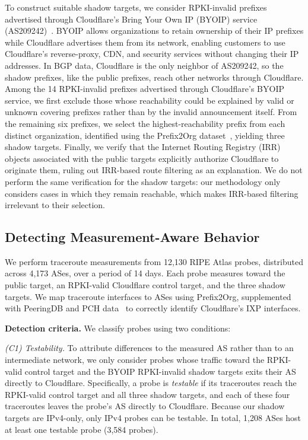 \documentclass[sigconf, 10pt]{acmart}
\begin{document}
To construct suitable shadow targets, we consider RPKI-invalid prefixes advertised through Cloudflare's Bring Your Own IP (BYOIP) service (AS209242)~\cite{byoip}. BYOIP allows organizations to retain ownership of their IP prefixes while Cloudflare advertises them from its network, enabling customers to use Cloudflare's reverse-proxy, CDN, and security services without changing their IP addresses. In BGP data, Cloudflare is the only neighbor of AS209242, so the shadow prefixes, like the public prefixes, reach other networks through Cloudflare. Among the 14 RPKI-invalid prefixes advertised through Cloudflare's BYOIP service, we first exclude those whose reachability could be explained by valid or unknown covering prefixes rather than by the invalid announcement itself. From the remaining six prefixes, we select the highest-reachability prefix from each distinct organization, identified using the Prefix2Org dataset~\cite{prefix2org}, yielding three shadow targets. Finally, we verify that the Internet Routing Registry (IRR) objects associated with the public targets explicitly authorize Cloudflare to originate them, ruling out IRR-based route filtering as an explanation. We do not perform the same verification for the shadow targets: our methodology only considers cases in which they remain reachable, which makes IRR-based filtering irrelevant to their selection.


\subsection{Detecting Measurement-Aware Behavior}
\label{sec:detection}

We perform traceroute measurements from 12,130 RIPE Atlas probes, distributed across 4,173 ASes, over a period of 14 days. Each probe measures toward the public target, an RPKI-valid Cloudflare control target, and the three shadow targets. We map traceroute interfaces to ASes using Prefix2Org, supplemented with PeeringDB and PCH data~\cite{peeringdb,pch} to correctly identify Cloudflare's IXP interfaces.

\noindent\textbf{Detection criteria.} We classify probes using two conditions:

\noindent\emph{(C1) Testability.} To attribute differences to the measured AS rather than to an intermediate network, we only consider probes whose traffic toward the RPKI-valid control target and the BYOIP RPKI-invalid shadow targets exits their AS directly to Cloudflare. Specifically, a probe is \emph{testable} if its traceroutes reach the RPKI-valid control target and all three shadow targets, and each of these four traceroutes leaves the probe's AS directly to Cloudflare. Because our shadow targets are IPv4-only, only IPv4 probes can be testable. In total, 1,208 ASes host at least one testable probe (3,584 probes).
\end{document}
